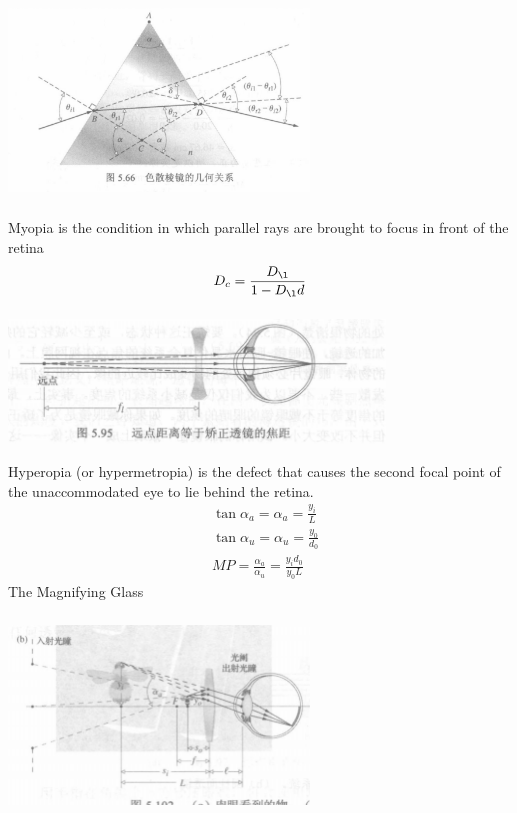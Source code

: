 \documentclass[fleqn,leqno]{article}
\begin{document}
		\includegraphics[width=8cm,height=6cm]{prism.png}\\
		Myopia is the condition in which parallel rays are brought to focus in front of the retina\\
		\begin{equation}
			D_{c}=\frac{D_{\l}}{1-D_{\l}d}
		\end{equation}
		\includegraphics[width=10cm,height=4cm]{far point.png}\\
		Hyperopia (or hypermetropia) is the defect that causes the second focal point of the unaccommodated eye to lie behind the retina.\\
		\begin{equation*}
			\begin{split}
				&\tan\alpha_{a}=\alpha_{a}=\frac{y_{i}}{L}\\
				&\tan\alpha_{u}=\alpha_{u}=\frac{y_{0}}{d_{0}}\\
				&MP=\frac{\alpha_{a}}{\alpha_{u}}=\frac{y_{i}d_{0}}{y_{0}L}
			\end{split}
		\end{equation*}
		The Magnifying Glass\\
		\includegraphics[width=8cm,height=6cm]{enlarge.png}
\end{document}
